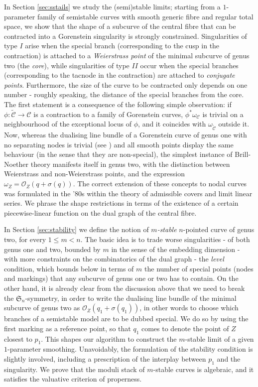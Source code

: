 \documentclass{compositio}
\newcommand{\OO}{\mathcal O}
\renewcommand{\to}{\rightarrow}
\theoremstyle{plain}
\theoremstyle{definition}
\theoremstyle{remark}
\begin{document}
In Section \ref{sec:sstails} we study the (semi)stable limits; starting from a $1$-parameter family of semistable curves with smooth generic fibre and regular total space, we show that the shape of a subcurve of the central fibre that can be contracted into a Gorenstein singularity is strongly constrained. Singularities of type $I$ arise when the special branch (corresponding to the cusp in the contraction) is attached to a \emph{Weierstrass point} of the minimal subcurve of genus two (the \emph{core}), while singularities of type $I\!I$ occur when the special branches (corresponding to the tacnode in the contraction) are attached to \emph{conjugate points}. Furthermore, the size of the curve to be contracted only depends on one number - roughly speaking, the distance of the special branches from the core. The first statement is a consequence of the following simple observation: if $\phi\colon\widetilde{\mathcal C}\to\mathcal C$ is a contraction to a family of Gorenstein curves, $\phi^*\omega_{\mathcal C}$ is trivial on a neighbourhood of the exceptional locus of $\phi$, and it coincides with $\omega_{\widetilde{\mathcal C}}$ outside it. Now, whereas the dualising line bundle of a Gorenstein curve of genus one with no separating nodes is trivial (see \cite[Lemma 3.3]{SMY1}) and all smooth points display the same behaviour (in the sense that they are non-special), the simplest instance of Brill-Noether theory manifests itself in genus two, with the distinction between Weierstrass and non-Weierstrass points, and the expression $\omega_Z=\OO_Z(q+\sigma(q))$. The correct extension of these concepts to nodal curves was formulated in the '80s within the theory of admissible covers and limit linear series. We phrase the shape restrictions in terms of the existence of a certain piecewise-linear function on the dual graph of the central fibre.

In Section \ref{sec:stability} we define the notion of \emph{$m$-stable} $n$-pointed curve of genus two, for every $1\leq m<n$. The basic idea is to trade worse singularities - of both genus one and two, bounded by $m$ in the sense of the embedding dimension - with more constraints on the combinatorics of the dual graph - the \emph{level} condition, which bounds below in terms of $m$ the number of special points (nodes and markings) that any subcurve of genus one or two has to contain. On the other hand, it is already clear from the discussion above that we need to break the $\mathfrak S_n$-symmetry, in order to write the dualising line bundle of the minimal subcurve of genus two as $\OO_Z(q_1+\sigma(q_1))$, in other words to choose which branches of a semistable model are to be dubbed special. We do so by using the first marking as a reference point, so that $q_1$ comes to denote the point of $Z$ closest to $p_1$. This shapes our algorithm to construct the $m$-stable limit of a given $1$-parameter smoothing. Unavoidably, the formulation of the stability condition is slightly involved, including a prescription of the interplay between $p_1$ and the singularity. We prove that the moduli stack of $m$-stable curves is algebraic, and it satisfies the valuative criterion of properness.
\end{document}
